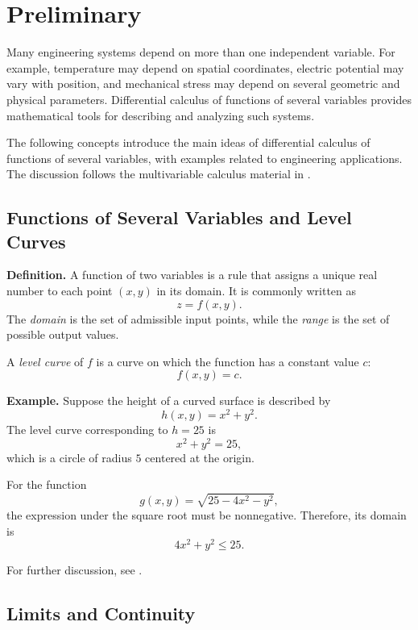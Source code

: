 \documentclass[a4paper,12pt]{article}
\theoremstyle{mystyle}
\numberwithin{equation}{section}
\numberwithin{theorem}{section}
\numberwithin{proposition}{section}
\numberwithin{example}{section}
\numberwithin{remark}{section}
\numberwithin{lemma}{section}
\numberwithin{corollary}{section}
\numberwithin{definition}{section}
\begin{document}
\section{Preliminary}
\label{S:2}
Many engineering systems depend on more than one independent
variable. For example, temperature may depend on spatial coordinates,
electric potential may vary with position, and mechanical stress may
depend on several geometric and physical parameters. Differential
calculus of functions of several variables provides mathematical tools
for describing and analyzing such systems.

The following concepts introduce the main ideas of differential
calculus of functions of several variables, with examples related
to engineering applications. The discussion follows the multivariable
calculus material in \cite{openstax2016}.

\subsection{Functions of Several Variables and Level Curves}

\textbf{Definition.}
A function of two variables is a rule that assigns a unique real
number to each point $(x,y)$ in its domain. It is commonly written as
\[
    z=f(x,y).
\]
The \textit{domain} is the set of admissible input points, while the
\textit{range} is the set of possible output values.

A \textit{level curve} of $f$ is a curve on which the function has
a constant value $c$:
\[
    f(x,y)=c.
\]

\textbf{Example.}
Suppose the height of a curved surface is described by
\[
    h(x,y)=x^2+y^2.
\]
The level curve corresponding to $h=25$ is
\[
    x^2+y^2=25,
\]
which is a circle of radius $5$ centered at the origin.

For the function
\[
    g(x,y)=\sqrt{25-4x^2-y^2},
\]
the expression under the square root must be nonnegative. Therefore,
its domain is
\[
    4x^2+y^2\leq 25.
\]

For further discussion, see \cite[Section~4.1]{openstax2016}.

\subsection{Limits and Continuity}
\end{document}
